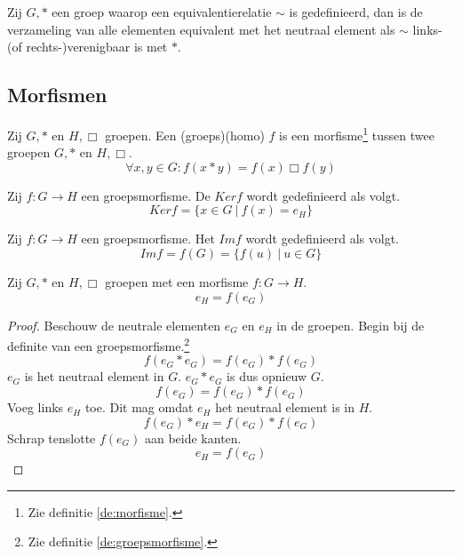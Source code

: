 \documentclass[main.tex]{subfiles}
\begin{document}
\begin{st}
  Zij $G,*$ een groep waarop een equivalentierelatie $\sim$ is gedefinieerd, dan is de verzameling van alle elementen equivalent met het neutraal element als $\sim$ links-(of rechts-)verenigbaar is met $*$.
  
\end{st}

\subsection{Morfismen}
\label{sec:morfismen}

\begin{de}
  \label{de:groepsmorfisme}
  Zij $G,*$ en $H,\Box$ groepen.
  Een (groeps)(homo) $f$ is een morfisme\footnote{Zie definitie \ref{de:morfisme}.} tussen twee groepen $G,*$ en $H,\Box$.
  \[ \forall x,y \in G: f(x*y) = f(x) \Box f(y) \]
\end{de}

\begin{de}
  Zij $f: G \rightarrow H$ een groepsmorfisme. De  $Ker f$ wordt gedefinieerd als volgt.
  \[ Ker f = \{ x \in G \ |\ f(x) = e_{H} \} \]
\end{de}

\begin{de}
  Zij $f: G \rightarrow H$ een groepsmorfisme. Het  $Im f$ wordt gedefinieerd als volgt.
  \[ Im f = f(G) = \{ f(u) \ |\ u \in G \} \]
\end{de}


\begin{st}
  \label{st:groepsmorfisme-behoudt-neutraal-element}
  Zij $G,*$ en $H,\Box$ groepen met een morfisme $f: G \rightarrow H$.
  \[ e_{H} = f(e_{G}) \]

  \begin{proof}
    Beschouw de neutrale elementen $e_{G}$ en $e_{H}$ in de groepen.
    Begin bij de definite van een groepsmorfisme.\footnote{Zie definitie \ref{de:groepsmorfisme}.}
    \[ f(e_{G}*e_{G}) = f(e_{G})*f(e_{G}) \]
    $e_{G}$ is het neutraal element in $G$. $e_{G}*e_{G}$ is dus opnieuw $G$.
    \[ f(e_{G}) = f(e_{G})*f(e_{G}) \]
    Voeg links $e_{H}$ toe. Dit mag omdat $e_{H}$ het neutraal element is in $H$.
    \[ f(e_{G})*e_{H} = f(e_{G})*f(e_{G}) \]
    Schrap tenslotte $f(e_{G})$ aan beide kanten.
    \[ e_{H} = f(e_{G}) \]
  \end{proof}
\end{st}
\end{document}
